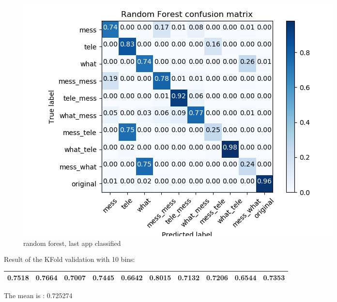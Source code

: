  \begin{figure}[H] 
\centering 
\includegraphics[scale=.6]{images/new_met_rf_initial_single_double_complete.png} 
\caption{random forest, last app classified} 
\end{figure} 


Result of the KFold validation with 10 bins:
 {\def\arraystretch{1.3} 
 \begin{table}[H] 
\centering 
\begin{tabular}{|l |l |l |l |l |l |l |l |l |l |}  
\hline 
0.7518&
0.7664&
0.7007&
0.7445&
0.6642&
0.8015&
0.7132&
0.7206&
0.6544&
0.7353\\ \hline  

\end{tabular} 
\end{table} }

The mean is : 0.725274